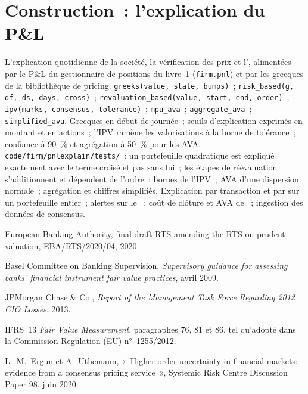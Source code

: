 \section{Construction~: l'explication du P\&L}\label{bld:rc:pnl-explain-and-independent-price-verification:pnlexplain}

\begin{build}
 L'explication quotidienne de la société, la vérification des prix et l', alimentées par le P\&L
du gestionnaire de positions du livre~1 (\texttt{firm.pnl}) et par les grecques de la bibliothèque de pricing.
 \texttt{greeks(value, state, bumps)}~; \texttt{risk\_based(g, df, ds, days, cross)}~;
\texttt{revaluation\_based(value, start, end, order)}~; \texttt{ipv(marks, consensus, tolerance)}~;
\texttt{mpu\_ava}~; \texttt{aggregate\_ava}~; \texttt{simplified\_ava}.
 Grecques en début de journée~; seuils d'explication exprimés en montant et en actions~; l'IPV ramène les valorisations à la
borne de tolérance~; confiance à 90~\% et agrégation à 50~\% pour les AVA.
 \texttt{code/firm/pnlexplain/tests/}~: un portefeuille quadratique est expliqué exactement avec le
terme croisé et pas sans lui~; les étapes de réévaluation s'additionnent et dépendent de l'ordre~; bornes de l'IPV~; AVA d'une
dispersion normale~; agrégation et chiffres simplifiés.
 Explication par transaction et par  sur un portefeuille entier~; alertes sur le ~; coût de
clôture et AVA de ~; ingestion des données de consensus.
\end{build}

\begin{omsources}
\item European Banking Authority, final draft RTS amending the RTS on prudent valuation, EBA/RTS/2020/04, 2020.
\item Basel Committee on Banking Supervision, \emph{Supervisory guidance for assessing banks' financial
instrument fair value practices}, avril 2009.
\item JPMorgan Chase \& Co., \emph{Report of the Management Task Force Regarding 2012 CIO Losses}, 2013.
\item IFRS~13 \emph{Fair Value Measurement}, paragraphes 76, 81 et 86, tel qu'adopté dans
la Commission Regulation (EU) n°~1255/2012.
\item L.~M.\ Ergun et A.~Uthemann, «~Higher-order uncertainty in financial markets: evidence from a
consensus pricing service~», Systemic Risk Centre Discussion Paper 98, juin 2020.
\end{omsources}

